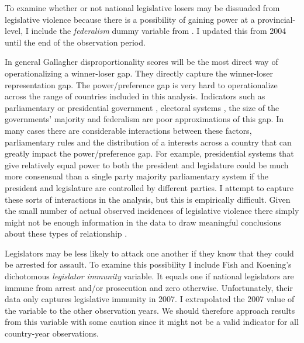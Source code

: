 \documentclass[a4paper]{article}\usepackage{graphicx, color}
\begin{document}
To examine whether or not national legislative losers may be dissuaded from legislative violence because there is a possibility of gaining power at a provincial-level, I include the \emph{federalism} dummy variable from \cite{Carey2011}. I updated this from 2004 until the end of the observation period.

In general Gallagher disproportionality scores will be the most direct way of operationalizing a winner-loser gap. They directly capture the winner-loser representation gap. The power/preference gap is very hard to operationalize across the range of countries included in this analysis. Indicators such as parliamentary or presidential government \citep{Horowitz1990}, electoral systems \cite{Lijphart1994}, the size of the governments' majority and federalism are poor approximations of this gap. In many cases there are considerable interactions between these factors, parliamentary rules and the distribution of a interests across a country that can greatly impact the power/preference gap. For example, presidential systems that give relatively equal power to both the president and legislature could be much more consensual than a single party majority parliamentary system if the president and legislature are controlled by different parties. I attempt to capture these sorts of interactions in the analysis, but this is empirically difficult. Given the small number of actual observed incidences of legislative violence there simply might not be enough information in the data to draw meaningful conclusions about these types of relationship \citep[see][]{Brambor2006}.

Legislators may be less likely to attack one another if they know that they could be arrested for assault. To examine this possibility I include Fish and Koening's \citeyearpar{Fish2009} dichotomous \emph{legislator immunity} variable. It equals one if national legislators are immune from arrest and/or prosecution and zero otherwise. Unfortunately, their data only captures legislative immunity in 2007. I extrapolated the 2007 value of the variable to the other observation years. We should therefore approach results from this variable with some caution since it might not be a valid indicator for all country-year observations.
\end{document}

